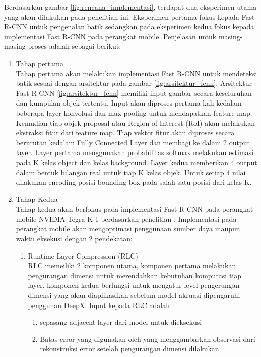 Berdasarkan gambar \ref{fig:rencana_implementasi}, terdapat dua eksperimen utama yang akan dilakukan pada penelitian ini. Eksperimen pertama fokus kepada Fast R-CNN untuk pengenalan batik sedangkan pada eksperimen kedua fokus kepada implementasi Fast R-CNN pada perangkat mobile. Penjelasan untuk masing-masing proses adalah sebagai berikut:
\begin{enumerate}
	\item Tahap pertama\\
	Tahap pertama akan melakukan implementasi Fast R-CNN untuk mendeteksi batik sesuai dengan arsitektur pada gambar \ref{fig:arsitektur_fcnn}. Arsitektur Fast R-CNN \ref{fig:arsitektur_fcnn} memiliki input gambar secara keseluruhan dan kumpulan objek tertentu. Input akan diproses pertama kali kedalam beberapa layer konvolusi dan max pooling untuk mendapatkan feature map. Kemudian tiap objek proposal atau Region of Interest (RoI) akan melakukan ekstraksi fitur dari feature map. Tiap vektor fitur akan diproses secara berurutan kedalam Fully Connected Layer dan membagi ke dalam 2 output layer. Layer pertama menggunakan probabilitas softmax melakukan estimasi pada K kelas object dan kelas background. Layer kedua memberikan 4 output dalam bentuk bilangan real untuk tiap K kelas objek. Untuk setiap 4 nilai dilakukan encoding posisi bounding-box pada salah satu posisi dari kelas K.
	\item Tahap Kedua\\
	Tahap kedua akan berfokus pada implementasi Fast R-CNN pada perangkat mobile NVIDIA Tegra K-1 berdasarkan penelitian \cite{deepx}. Implementasi pada perangkat mobile akan mengoptimasi penggunaan sumber daya maupun waktu eksekusi dengan 2 pendekatan:
	\begin{enumerate}
		\item Runtime Layer Compression (RLC)\\
		RLC memeiliki 2 komponen utama, komponen pertama melakukan pengurangan dimensi untuk merendahkan kebutuhan komputasi tiap layer. komponen kedua berfungsi untuk mengatur level pengerungan dimensi yang akan diaplikasikan sebelum model akruasi dipengaruhi penggunan DeepX. Input kepada RLC adalah
		\begin{enumerate}
			\item sepasang adjacent layer dari model untuk dieksekusi
			\item Batas error yang digunakan oleh yang menggambarkan observasi dari rekonstruksi error setelah pengurangan dimensi dilakukan
		\end{enumerate}

\end{enumerate}
\end{enumerate}
